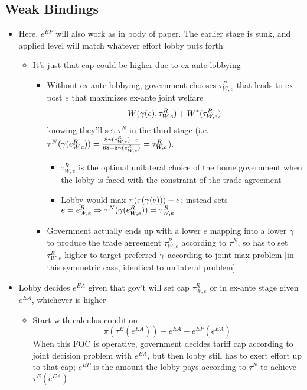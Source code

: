 \subsection{Weak Bindings}
\begin{itemize}
	\item Here, $e^{EP}$ will also work as in body of paper. The earlier stage is sunk, and applied level will match whatever effort lobby puts forth
		\begin{itemize}
			\item It's just that cap could be higher due to ex-ante lobbying
				\begin{itemize}
					\item Without ex-ante lobbying, government chooses $\tau^R_{W,e}$ that leads to ex-post $e$ that maximizes ex-ante joint welfare
		\[
		  W(\gamma(e),\tau^R_{W,e}) + W^*(\tau^R_{W,e})
		\]
		knowing they'll set $\tau^N$ in the third stage (i.e. $\tau^N(\gamma(e^R_{W,e})) = \frac{8\gamma(e^R_{W,e}) - 5}{68 - 8 \gamma(e^R_{W,e})} = \tau^R_{W,e}$).
						\begin{itemize}
							\item $\tau^R_{W,e}$ is the optimal unilateral choice of the home government when the lobby is faced with the constraint of the trade agreement
							\item Lobby would max $\pi(\tau(\gamma(e))) -e$; instead sets $e = e^R_{W,e} \Rightarrow \tau^N(\gamma(e^R_{W,e})) =\tau^R_{W,e}$
						\end{itemize}
					\item Government actually ends up with a lower $e$ mapping into a lower $\gamma$ to produce the trade agreement $\tau^R_{W,e}$ according to $\tau^N$, so has to set $\tau^R_{W,e}$ higher to target preferred $\gamma$ according to joint max problem [in this symmetric case, identical to unilateral problem]
			\end{itemize}
		\end{itemize}
	\item Lobby decides $e^{EA}$ given that gov't will set cap $\tau^R_{W,e}$ or in ex-ante stage given $e^{EA}$, whichever is higher
		\begin{itemize}
			\item Start with calculus condition
				\[
				  \pi(\tau^E(e^{EA})) - e^{EA} - e^{EP}(e^{EA})
				\]
				When this FOC is operative, government decides tariff cap according to joint decision problem with $e^{EA}$, but then lobby still has to exert effort up to that cap; $e^{EP}$ is the amount the lobby pays according to $\tau^N$ to achieve $\tau^E(e^{EA})$

\end{itemize}
\end{itemize}
